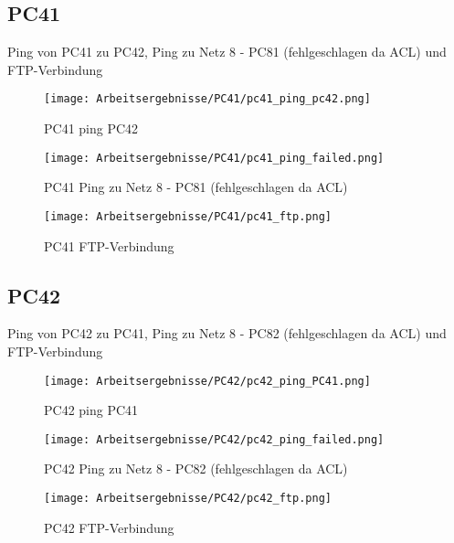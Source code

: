 \documentclass{article}
\begin{document}
\subsection{PC41}
Ping von PC41 zu PC42, Ping zu Netz 8 - PC81 (fehlgeschlagen da ACL) und FTP-Verbindung\\
\begin{figure}[!htp]
  \centering
  \begin{minipage}[b]{0.25\textwidth}
    \texttt{[image: Arbeitsergebnisse/PC41/pc41\_ping\_pc42.png]}
    \caption{PC41 ping PC42}
  \end{minipage}
  \hspace{0.8cm}
  \begin{minipage}[b]{0.25\textwidth}
    \texttt{[image: Arbeitsergebnisse/PC41/pc41\_ping\_failed.png]}
    \caption{PC41 Ping zu Netz 8 - PC81 (fehlgeschlagen da ACL)}
  \end{minipage}
  \hspace{0.8cm}
  \begin{minipage}[b]{0.25\textwidth}
    \texttt{[image: Arbeitsergebnisse/PC41/pc41\_ftp.png]}
    \caption{PC41 FTP-Verbindung}
  \end{minipage}
\end{figure}

\subsection{PC42}
Ping von PC42 zu PC41, Ping zu Netz 8 - PC82 (fehlgeschlagen da ACL) und FTP-Verbindung\\
\begin{figure}[!htp]
  \centering
  \begin{minipage}[b]{0.25\textwidth}
    \texttt{[image: Arbeitsergebnisse/PC42/pc42\_ping\_PC41.png]}
    \caption{PC42 ping PC41}
  \end{minipage}
  \hspace{0.8cm}
  \begin{minipage}[b]{0.25\textwidth}
    \texttt{[image: Arbeitsergebnisse/PC42/pc42\_ping\_failed.png]}
    \caption{PC42 Ping zu Netz 8 - PC82 (fehlgeschlagen da ACL)}
  \end{minipage}
  \hspace{0.8cm}
  \begin{minipage}[b]{0.25\textwidth}
    \texttt{[image: Arbeitsergebnisse/PC42/pc42\_ftp.png]}
    \caption{PC42 FTP-Verbindung}
  \end{minipage}
\end{figure}
\end{document}
